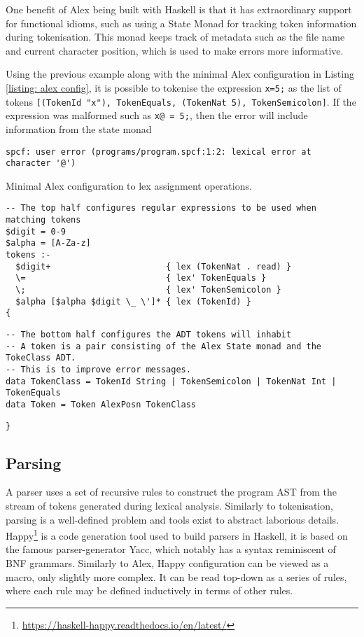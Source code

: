\documentclass[12pt,a4paper]{report}
\theoremstyle{definition}
\theoremstyle{remark}
\begin{document}
One benefit of Alex being built with Haskell is that it has extraordinary support for functional idioms, such as using a State Monad for tracking token information during tokenisation. This monad keeps track of metadata such as the file name and current character position, which is used to make errors more informative. 

Using the previous example along with the minimal Alex configuration in Listing \ref{listing: alex config}, it is possible to tokenise the expression \lstinline{x=5;} as the list of tokens \lstinline{[(TokenId "x"), TokenEquals, (TokenNat 5), TokenSemicolon]}. If the expression was malformed such as \lstinline{x@ = 5;}, then the error will include information from the state monad
\begin{verbatim}
spcf: user error (programs/program.spcf:1:2: lexical error at character '@')
\end{verbatim}

\begin{listing}
\label{listing: alex config}
\caption{Minimal Alex configuration to lex assignment operations.}
\begin{verbatim}
-- The top half configures regular expressions to be used when matching tokens
$digit = 0-9
$alpha = [A-Za-z]
tokens :-
  $digit+                       { lex (TokenNat . read) }
  \=                            { lex' TokenEquals }
  \;                            { lex' TokenSemicolon }
  $alpha [$alpha $digit \_ \']* { lex (TokenId) }
{
\end{verbatim}
\begin{verbatim}
-- The bottom half configures the ADT tokens will inhabit
-- A token is a pair consisting of the Alex State monad and the TokeClass ADT.
-- This is to improve error messages.
data TokenClass = TokenId String | TokenSemicolon | TokenNat Int | TokenEquals
data Token = Token AlexPosn TokenClass
\end{verbatim}
\begin{verbatim}
}
\end{verbatim}
\end{listing}

\subsection{Parsing} 
A parser uses a set of recursive rules to construct the program AST from the stream of tokens generated during lexical analysis. Similarly to tokenisation, parsing is a well-defined problem and tools exist to abstract laborious details. Happy\footnote{\url{https://haskell-happy.readthedocs.io/en/latest/}} is a code generation tool used to build parsers in Haskell, it is based on the famous parser-generator Yacc, which notably has a syntax reminiscent of BNF grammars. Similarly to Alex, Happy configuration can be viewed as a macro, only slightly more complex. It can be read top-down as a series of rules, where each rule may be defined inductively in terms of other rules. 
\end{document}
